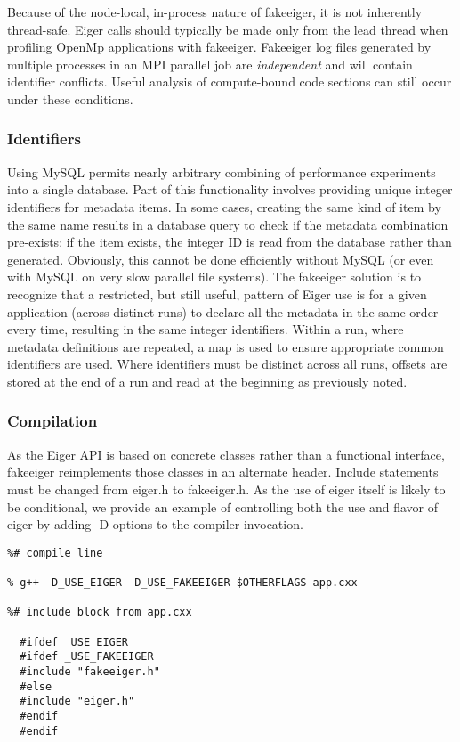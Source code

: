 Because of the node-local, in-process nature of fakeeiger, it is not inherently thread-safe. Eiger calls should typically be made only from the lead thread when profiling OpenMp applications with fakeeiger. Fakeeiger log files generated by multiple processes in an MPI parallel job are {\em independent} and will contain identifier conflicts. Useful analysis of compute-bound code sections can still occur under these conditions.

\subsubsection{Identifiers} Using MySQL permits nearly arbitrary combining of performance experiments into a single database. Part of this functionality involves providing unique integer identifiers for metadata items. In some cases, creating the same kind of item by the same name results in a database query to check if the metadata combination pre-exists; if the item exists, the integer ID is read from the database rather than generated. Obviously, this cannot be done efficiently without MySQL (or even with MySQL on very slow parallel file systems). The fakeeiger solution is to recognize that a restricted, but still useful, pattern of Eiger use is for a given application (across distinct runs) to declare all the metadata in the same order every time, resulting in the same integer identifiers. Within a run, where metadata definitions are repeated, a map is used to ensure appropriate common identifiers are used. Where identifiers must be distinct across all runs, offsets are stored at the end of a run and read at the beginning as previously noted. 

\subsubsection{Compilation} As the Eiger API is based on concrete classes rather than a functional interface, fakeeiger reimplements those classes in an alternate header. Include statements must be changed from eiger.h to fakeeiger.h. As the use of eiger itself is likely to be conditional, we provide an example of controlling both the use and flavor of eiger by adding -D options to the compiler invocation.

\begin{verbatim} 
%# compile line

% g++ -D_USE_EIGER -D_USE_FAKEEIGER $OTHERFLAGS app.cxx

%# include block from app.cxx

  #ifdef _USE_EIGER
  #ifdef _USE_FAKEEIGER
  #include "fakeeiger.h"
  #else
  #include "eiger.h"
  #endif
  #endif

\end{verbatim}

